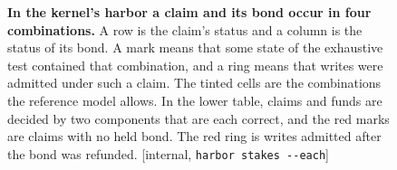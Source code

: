\begin{figure}[H]
\caption{\textbf{In the kernel's harbor a claim and its bond occur in
four combinations.} A row is the claim's status and a column is the status
of its bond. A mark means that some state of the exhaustive test contained
that combination, and a ring means that writes were admitted under such a
claim. The tinted cells are the combinations the reference model allows.
In the lower table, claims and funds are decided by two components that
are each correct, and the red marks are claims with no held bond. The red
ring is writes admitted after the bond was refunded. [internal,
\texttt{harbor stakes -{}-each}]}
\label{fig:bonded-pairs}
\end{figure}
